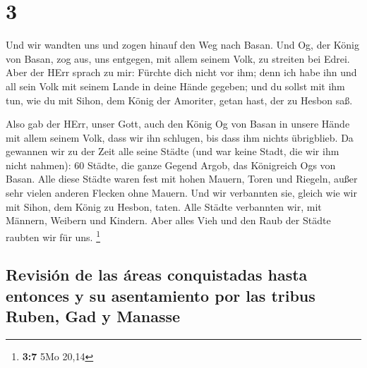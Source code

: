 \hypertarget{section-2}{%
\section{3}\label{section-2}}

 Und wir wandten uns und zogen hinauf den Weg nach Basan.
Und Og, der König von Basan, zog aus, uns entgegen, mit allem seinem
Volk, zu streiten bei Edrei.  Aber der HErr sprach zu mir:
Fürchte dich nicht vor ihm; denn ich habe ihn und all sein Volk mit
seinem Lande in deine Hände gegeben; und du sollst mit ihm tun, wie du
mit Sihon, dem König der Amoriter, getan hast, der zu Hesbon saß.

 Also gab der HErr, unser Gott, auch den König Og von
Basan in unsere Hände mit allem seinem Volk, dass wir ihn schlugen, bis
dass ihm nichts übrigblieb.  Da gewannen wir zu der Zeit
alle seine Städte (und war keine Stadt, die wir ihm nicht nahmen): 60
Städte, die ganze Gegend Argob, das Königreich Ogs von Basan.
 Alle diese Städte waren fest mit hohen Mauern, Toren und
Riegeln, außer sehr vielen anderen Flecken ohne Mauern. 
Und wir verbannten sie, gleich wie wir mit Sihon, dem König zu Hesbon,
taten. Alle Städte verbannten wir, mit Männern, Weibern und Kindern.
 Aber alles Vieh und den Raub der Städte raubten wir für
uns. \footnote{\textbf{3:7} 5Mo 20,14}

\hypertarget{revisiuxf3n-de-las-uxe1reas-conquistadas-hasta-entonces-y-su-asentamiento-por-las-tribus-ruben-gad-y-manasse}{%
\subsection{Revisión de las áreas conquistadas hasta entonces y su
asentamiento por las tribus Ruben, Gad y
Manasse}\label{revisiuxf3n-de-las-uxe1reas-conquistadas-hasta-entonces-y-su-asentamiento-por-las-tribus-ruben-gad-y-manasse}}

